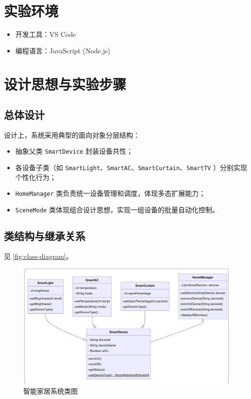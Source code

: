 \documentclass[12pt,hyperref,a4paper,UTF8]{ctexart}
\begin{document}
\section{实验环境}
\begin{itemize}
    \item 开发工具：VS Code
    \item 编程语言：JavaScript (Node.js)
\end{itemize}

\section{设计思想与实验步骤}
\subsection{总体设计}
设计上，系统采用典型的面向对象分层结构：
\begin{itemize}
    \item 抽象父类 \texttt{SmartDevice} 封装设备共性；
    \item 各设备子类（如 \texttt{SmartLight}、\texttt{SmartAC}、\texttt{SmartCurtain}、\texttt{SmartTV} ）分别实现个性化行为；
    \item \texttt{HomeManager} 类负责统一设备管理和调度，体现多态扩展能力；
    \item \texttt{SceneMode} 类体现组合设计思想，实现一组设备的批量自动化控制。
\end{itemize}

\subsection{类结构与继承关系}
见 \autoref{fig:class-diagram}。

\begin{figure}[h!]
    \centering
    \includegraphics[width=.75\textwidth]{../lab2/class_diagram.png} %
    \caption{智能家居系统类图}
    \label{fig:class-diagram}
\end{figure}
\end{document}
